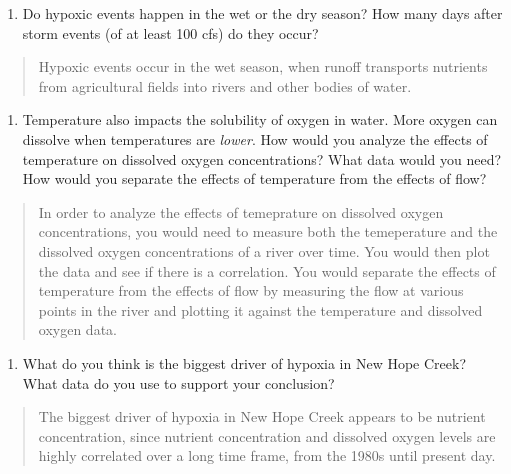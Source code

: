 \documentclass[]{article}
\providecommand{\tightlist}{%
  \setlength{\itemsep}{0pt}\setlength{\parskip}{0pt}}
\begin{document}
\begin{enumerate}
\def\labelenumi{\arabic{enumi}.}
\setcounter{enumi}{11}
\tightlist
\item
  Do hypoxic events happen in the wet or the dry season? How many days
  after storm events (of at least 100 cfs) do they occur?
\end{enumerate}

\begin{quote}
Hypoxic events occur in the wet season, when runoff transports nutrients
from agricultural fields into rivers and other bodies of water.
\end{quote}

\begin{enumerate}
\def\labelenumi{\arabic{enumi}.}
\setcounter{enumi}{12}
\tightlist
\item
  Temperature also impacts the solubility of oxygen in water. More
  oxygen can dissolve when temperatures are \emph{lower}. How would you
  analyze the effects of temperature on dissolved oxygen concentrations?
  What data would you need? How would you separate the effects of
  temperature from the effects of flow?
\end{enumerate}

\begin{quote}
In order to analyze the effects of temeprature on dissolved oxygen
concentrations, you would need to measure both the temeperature and the
dissolved oxygen concentrations of a river over time. You would then
plot the data and see if there is a correlation. You would separate the
effects of temperature from the effects of flow by measuring the flow at
various points in the river and plotting it against the temperature and
dissolved oxygen data.
\end{quote}

\begin{enumerate}
\def\labelenumi{\arabic{enumi}.}
\setcounter{enumi}{13}
\tightlist
\item
  What do you think is the biggest driver of hypoxia in New Hope Creek?
  What data do you use to support your conclusion?
\end{enumerate}

\begin{quote}
The biggest driver of hypoxia in New Hope Creek appears to be nutrient
concentration, since nutrient concentration and dissolved oxygen levels
are highly correlated over a long time frame, from the 1980s until
present day.
\end{quote}
\end{document}
